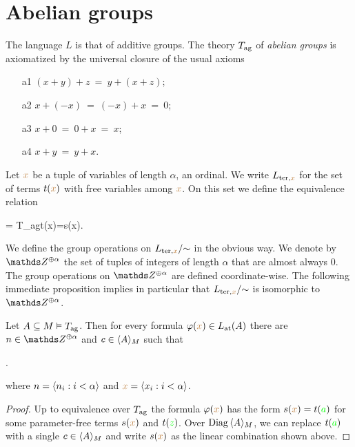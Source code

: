 \section{Abelian groups}
\label{gruppi}
The language $L$ is that of additive groups.
%
The theory \emph{$T_{\rm ag}$} of \emph{abelian groups\/} is axiomatized by the universal closure of the usual axioms\nobreak
\begin{itemize}
\item[a1] $(x+y) +z\ =\ y+(x+z)$;
\item[a2] $x+(-x)\ =\ (-x)+x\ =\ 0$;
\item[a3] $x+0\ = \ 0+x\ = \ x$;
\item[a4] $x+y\ =\ y+x$.
\end{itemize}
Let ${\mr x}$ be a tuple of variables of length $\alpha$, an ordinal.
%
We write $L_{{\rm ter},{\mr x}}$ for the set of terms $t({\mr x})$ with free variables among ${\mr x}$.
%
On this set we define the equivalence relation

%
{=}%
{T_{\rm ag}\proves t({\mr x})=s({\mr x}).}

We define the group operations on $L_{{\rm ter},{\mr x}}/\mathord{\sim}$ in the obvious way.
%
We denote by $\ZZ^{\oplus\alpha}$ the set of tuples of integers of length $\alpha$ that are almost always $0$.
%
The group operations on $\ZZ^{\oplus\alpha}$ are defined coordinate-wise.
%
The following immediate proposition implies in particular that  $L_{{\rm ter},{\mr x}}/\mathord{\sim}$ is isomorphic to $\ZZ^{\oplus\alpha}$.

\begin{proposition}\label{corol_formacanonicaterminimoduli}
  Let $A\subseteq M\models T_{\rm ag}$.
  Then for every formula $\phi({\mr x})\in L_{\rm at}(A)$ there are $n\in\ZZ^{\oplus\alpha}$ and $c\in\<A\>_M$ such that 

  .

  where $n=\<n_i:i<\alpha\>$ and  ${\mr x}=\<x_i:i<\alpha\>$.
\end{proposition}

\begin{proof}
  Up to equivalence over $T_{\rm ag}$ the formula $\phi({\mr x})$ has the form $s({\mr x})=t({\gr a})$ for some parameter-free terms $s({\mr x})$ and $t({\gr z})$.
  Over $\Diag\,\<A\>_M$, we can replace $t({\gr a})$ with a single  $c\in \<A\>_M$ and write $s({\mr x})$ as the linear combination shown above.
\end{proof}

